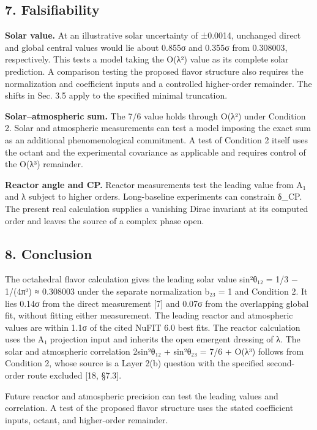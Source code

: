 \documentclass[
]{article}
\begin{document}
\hypertarget{falsifiability}{%
\subsection{7. Falsifiability}\label{falsifiability}}

\textbf{Solar value.} At an illustrative solar uncertainty of ±0.0014,
unchanged direct and global central values would lie about 0.855σ and
0.355σ from 0.308003, respectively. This tests a model taking the O(λ²)
value as its complete solar prediction. A comparison testing the
proposed flavor structure also requires the normalization and
coefficient inputs and a controlled higher-order remainder. The shifts
in Sec. 3.5 apply to the specified minimal truncation.

\textbf{Solar--atmospheric sum.} The 7/6 value holds through O(λ²) under
Condition 2. Solar and atmospheric measurements can test a model
imposing the exact sum as an additional phenomenological commitment. A
test of Condition 2 itself uses the octant and the experimental
covariance as applicable and requires control of the O(λ³) remainder.

\textbf{Reactor angle and CP.} Reactor measurements test the leading
value from A₁ and λ subject to higher orders. Long-baseline experiments
can constrain δ\_CP. The present real calculation supplies a vanishing
Dirac invariant at its computed order and leaves the source of a complex
phase open.

\hypertarget{conclusion}{%
\subsection{8. Conclusion}\label{conclusion}}

The octahedral flavor calculation gives the leading solar value sin²θ₁₂
= 1/3 − 1/(4π²) ≈ 0.308003 under the separate normalization b₂₃ = 1 and
Condition 2. It lies 0.14σ from the direct measurement {[}7{]} and 0.07σ
from the overlapping global fit, without fitting either measurement. The
leading reactor and atmospheric values are within 1.1σ of the cited
NuFIT 6.0 best fits. The reactor calculation uses the A₁ projection
input and inherits the open emergent dressing of λ. The solar and
atmospheric correlation 2sin²θ₁₂ + sin²θ₂₃ = 7/6 + O(λ³) follows from
Condition 2, whose source is a Layer 2(b) question with the specified
second-order route excluded {[}18, §7.3{]}.

Future reactor and atmospheric precision can test the leading values and
correlation. A test of the proposed flavor structure uses the stated
coefficient inputs, octant, and higher-order remainder.
\end{document}
